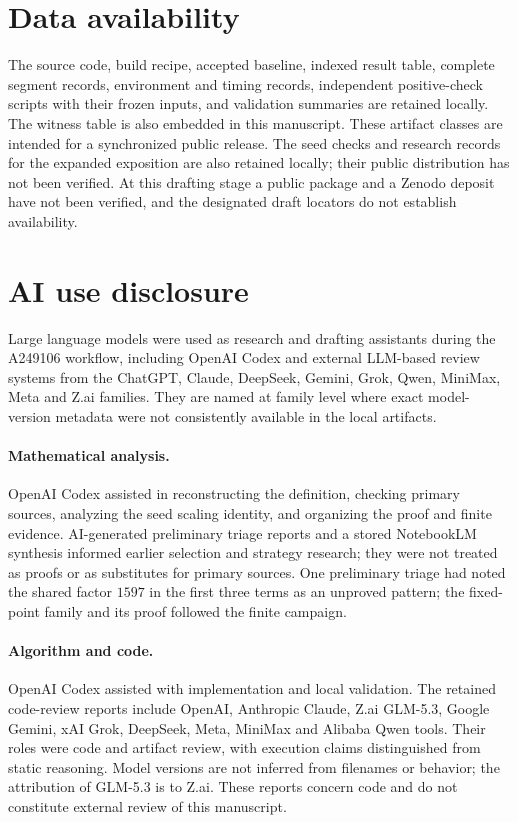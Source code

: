 \documentclass[11pt,a4paper]{article}
\theoremstyle{remark}
\begin{document}
\section{Data availability}
The source code, build recipe, accepted baseline, indexed result table,
complete segment records, environment and timing records, independent
positive-check scripts with their frozen inputs, and validation summaries
are retained locally. The witness table is also embedded in this manuscript.
These artifact classes are intended for a synchronized public release.
The seed checks and research records for the expanded exposition are
also retained locally; their public distribution has not been verified.
At this drafting stage a public package and a Zenodo deposit have not been
verified, and the designated draft locators do not establish availability.

\section{AI use disclosure}
Large language models were used as research and drafting assistants during
the A249106 workflow, including OpenAI Codex and external LLM-based review
systems from the ChatGPT, Claude, DeepSeek, Gemini, Grok, Qwen, MiniMax,
Meta and Z.ai families. They are named at family level where exact
model-version metadata were not consistently available in the local artifacts.
\paragraph{Mathematical analysis.}
OpenAI Codex assisted in reconstructing the definition, checking primary
sources, analyzing the seed scaling identity, and organizing the proof and
finite evidence. AI-generated preliminary triage reports and a stored
NotebookLM synthesis informed earlier selection and strategy research;
they were not treated as proofs or as substitutes for primary sources.
One preliminary triage had noted the shared factor $1597$ in the first three
terms as an unproved pattern; the fixed-point family and its proof followed
the finite campaign.

\paragraph{Algorithm and code.}
OpenAI Codex assisted with implementation and local validation. The retained
code-review reports include OpenAI, Anthropic Claude, Z.ai GLM-5.3, Google
Gemini, xAI Grok, DeepSeek, Meta, MiniMax and Alibaba Qwen tools. Their roles
were code and artifact review, with execution claims distinguished from
static reasoning. Model versions are not inferred from filenames or behavior;
the attribution of GLM-5.3 is to Z.ai. These reports concern code and do not
constitute external review of this manuscript.
\end{document}
